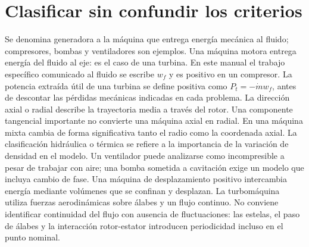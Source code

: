 \documentclass[10pt,openany]{book}
\begin{document}
\begin{minipage}{\linewidth}
{\begin{tikzpicture}
\end{tikzpicture}}%
\else
{}%
\fi
\fi
\endgroup
\par\nopagebreak
{}
\end{minipage}
\par\vspace{\baselineskip}

\section{Clasificar sin confundir los criterios}

Se denomina generadora a la máquina que entrega energía mecánica al fluido; compresores, bombas y ventiladores son ejemplos. Una máquina motora entrega energía del fluido al eje: es el caso de una turbina. En este manual el trabajo específico comunicado al fluido se escribe \(w_f\) y es positivo en un compresor. La potencia extraída útil de una turbina se define positiva como \(P_t=-\dot m w_f\), antes de descontar las pérdidas mecánicas indicadas en cada problema.
La dirección axial o radial describe la trayectoria media a través del rotor. Una componente tangencial importante no convierte una máquina axial en radial. En una máquina mixta cambia de forma significativa tanto el radio como la coordenada axial. La clasificación hidráulica o térmica se refiere a la importancia de la variación de densidad en el modelo. Un ventilador puede analizarse como incompresible a pesar de trabajar con aire; una bomba sometida a cavitación exige un modelo que incluya cambio de fase.
Una máquina de desplazamiento positivo intercambia energía mediante volúmenes que se confinan y desplazan. La turbomáquina utiliza fuerzas aerodinámicas sobre álabes y un flujo continuo. No conviene identificar continuidad del flujo con ausencia de fluctuaciones: las estelas, el paso de álabes y la interacción rotor-estator introducen periodicidad incluso en el punto nominal.
\end{document}
